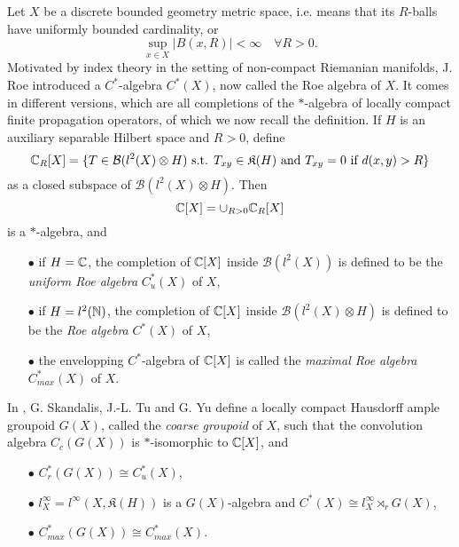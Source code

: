 

Let $X$ be a discrete bounded geometry metric space, i.e. means that its $R$-balls have uniformly bounded cardinality, or
\[\sup_{x\in X} |B(x,R)| < \infty \quad \forall R>0.\]
Motivated by index theory in the setting of non-compact Riemanian manifolds, J. Roe introduced a $C^*$-algebra $C^*(X)$, now called the Roe algebra of $X$. It comes in different versions, which are all completions of the $*$-algebra of locally compact finite propagation operators, of which we now recall the definition. If $H$ is an auxiliary separable Hilbert space and $R>0$, define 
\[ \mathbb C_R[X] = \{T\in\mathcal B(l^2(X)\otimes H)\text{ s.t. } T_{xy}\in \mathfrak K(H) \text{ and } T_{xy} = 0 \text{ if } d(x,y)>R \} \]
as a closed subspace of $\mathcal B(l^2(X)\otimes H)$. Then 
\[\mathbb C[X] = \cup_{R>0} \mathbb C_R[X]\]
is a $*$-algebra, and
\begin{itemize}
\item[$\bullet$] if $H=\mathbb C$, the completion of $\mathbb C[X]$ inside $\mathcal B(l^2(X))$ is defined to be the \textit{uniform Roe algebra} $C_u^*(X)$ of $X$,
\item[$\bullet$] if $H=l^2(\mathbb N)$, the completion of $\mathbb C[X]$ inside $\mathcal B(l^2(X)\otimes H)$ is defined to be the \textit{Roe algebra} $C^*(X)$  of $X$,
\item[$\bullet$] the envelopping $C^*$-algebra of $\mathbb C[X]$ is called the \textit{maximal Roe algebra} $C_{max}^*(X)$  of $X$.
\end{itemize}
In \cite{SkTuYu}, G. Skandalis, J.-L. Tu and G. Yu define a locally compact Hausdorff ample groupoid $G(X)$, called the \textit{coarse groupoid} of $X$, such that the convolution algebra $C_c(G(X))$ is $*$-isomorphic to $\mathbb C[X]$, and 
\begin{itemize}
\item[$\bullet$] $C^*_r(G(X)) \cong C_u^*(X)$,
\item[$\bullet$] $l^\infty_X=l^\infty(X, \mathfrak K(H))$ is a $G(X)$-algebra and $C^*(X)\cong l^\infty_X \rtimes_r G(X)$,
\item[$\bullet$] $C_{max}^*(G(X)) \cong C_{max}^*(X)$.
\end{itemize}

